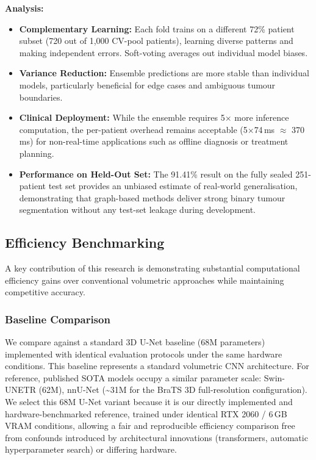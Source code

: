 \textbf{Analysis:}
\begin{itemize}
    \item \textbf{Complementary Learning:} Each fold trains on a different 72\% patient subset (720 out of 1,000 CV-pool patients), learning diverse patterns and making independent errors. Soft-voting averages out individual model biases.

    \item \textbf{Variance Reduction:} Ensemble predictions are more stable than individual models, particularly beneficial for edge cases and ambiguous tumour boundaries.

    \item \textbf{Clinical Deployment:} While the ensemble requires 5$\times$ more inference computation, the per-patient overhead remains acceptable (5$\times$74\,ms $\approx$ 370\,ms) for non-real-time applications such as offline diagnosis or treatment planning.

    \item \textbf{Performance on Held-Out Set:} The 91.41\% result on the fully sealed 251-patient test set provides an unbiased estimate of real-world generalisation, demonstrating that graph-based methods deliver strong binary tumour segmentation without any test-set leakage during development.
\end{itemize}


\subsection{Efficiency Benchmarking}

A key contribution of this research is demonstrating substantial computational efficiency gains over conventional volumetric approaches while maintaining competitive accuracy.

\subsubsection{Baseline Comparison}

We compare against a standard 3D U-Net baseline (68M parameters) implemented with identical evaluation protocols under the same hardware conditions. This baseline represents a standard volumetric CNN architecture. For reference, published SOTA models occupy a similar parameter scale: Swin-UNETR (62M), nnU-Net (\textasciitilde31M for the BraTS 3D full-resolution configuration). We select this 68M U-Net variant because it is our directly implemented and hardware-benchmarked reference, trained under identical RTX 2060 / 6\,GB VRAM conditions, allowing a fair and reproducible efficiency comparison free from confounds introduced by architectural innovations (transformers, automatic hyperparameter search) or differing hardware.

